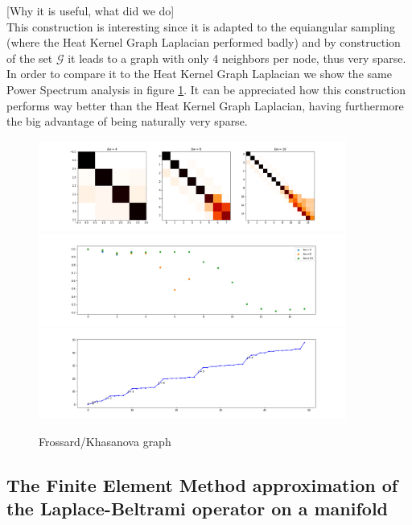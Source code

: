 [Why it is useful, what did we do]\\
This construction is interesting since it is adapted to the equiangular sampling (where the Heat Kernel Graph Laplacian performed badly) and by construction of the set $\mathcal G$ it leads to a graph with only 4 neighbors per node, thus very sparse. In order to compare it to the Heat Kernel Graph Laplacian we show the same Power Spectrum analysis in figure \ref{fig:Frossard/Khasanova graph}. It can be appreciated how this construction performs way better than the Heat Kernel Graph Laplacian, having furthermore the big advantage of being naturally very sparse.
\begin{figure}[h!]
	\label{fig:Frossard/Khasanova graph}
	\centering
	\includegraphics[width=0.9\textwidth]{../codes/02.HeatKernelGraphLaplacian/equiangular/equi_Khasanova_Frossard_full.png}
	\includegraphics[width=0.9\textwidth]{../codes/02.HeatKernelGraphLaplacian/equiangular/equi_Khasanova_Frossard_full_diagonal.png}
	\includegraphics[width=0.9\textwidth]{../codes/02.HeatKernelGraphLaplacian/equiangular/equi_full_Khasanova_Frossard_eigenvalues_16.png}
	\caption{Frossard/Khasanova graph}
\end{figure}

\subsection{The Finite Element Method approximation of the Laplace-Beltrami operator on a manifold}\label{sec:Chapter3: Using the Finite Element Method to approximate the Laplace-Beltrami operator on a manifold}


